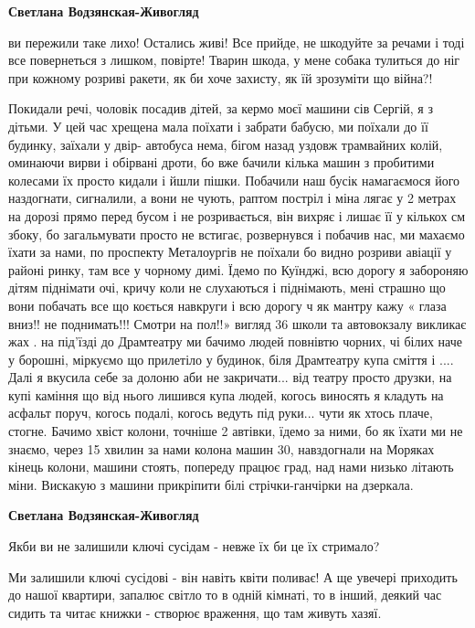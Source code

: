\begin{itemize}
\textbf{Светлана Водзянская-Живогляд} 

ви пережили таке лихо! Остались живі! Все прийде, не шкодуйте за речами і тоді
все повернеться з лишком, повірте! Тварин шкода, у мене собака тулиться до ніг
при кожному розриві ракети, як би хоче захисту, як їй зрозуміти що війна?!


Покидали речі, чоловік посадив дітей, за кермо моєї машини сів Сергій, я з
дітьми. У цей час хрещена мала поїхати і забрати бабусю, ми поїхали до її
будинку, заїхали у двір- автобуса нема, бігом назад уздовж трамвайних колій,
оминаючи вирви і обірвані дроти, бо вже бачили кілька машин з пробитими
колесами їх просто кидали і йшли пішки. Побачили наш бусік намагаємося його
наздогнати, сигналили, а вони не чують, раптом постріл і міна лягає у 2 метрах
на дорозі прямо перед бусом і не розривається, він вихряє і лишає її у кількох
см збоку, бо загальмувати просто не встигає, розвернувся і побачив нас, ми
махаємо їхати за нами, по проспекту Металоургів не поїхали бо видно розриви
авіації у районі ринку, там все у чорному димі. Їдемо по Куїнджі, всю дорогу я
забороняю дітям піднімати очі, кричу коли не слухаються і піднімають, мені
страшно що вони побачать все що коється навкруги і всю дорогу ч як мантру кажу
« глаза вниз!! не поднимать!!! Смотри на пол!!» вигляд 36 школи та автовокзалу
викликає жах . на під'їзді до Драмтеатру ми бачимо людей повнівтю чорних, чі
білих наче у борошні, міркуємо що прилетіло у будинок, біля Драмтеатру купа
сміття і .... Далі я вкусила себе за долоню аби не закричати... від театру просто
друзки, на купі каміння що від нього лишився купа людей, когось виносять я
кладуть на асфальт поруч, когось подалі, когось ведуть під руки... чути як хтось
плаче, стогне. Бачимо хвіст колони, точніше 2 автівки, їдемо за ними, бо як
їхати ми не знаємо, через 15 хвилин за нами колона машин 30, навздогнали на
Моряках кінець колони, машини стоять, попереду працює град, над нами низько
літають міни. Вискакую з машини прикріпити білі стрічки-ганчірки на дзеркала.

\textbf{Светлана Водзянская-Живогляд} 

Якби ви не залишили ключі сусідам - невже їх би це їх стримало?

Ми залишили ключі сусідові - він навіть квіти поливає! А ще увечері приходить
до нашої квартири, запалює світло то в одній кімнаті, то в інший, деякий час
сидить та читає книжки - створює враження, що там живуть хазяї.


\end{itemize}
